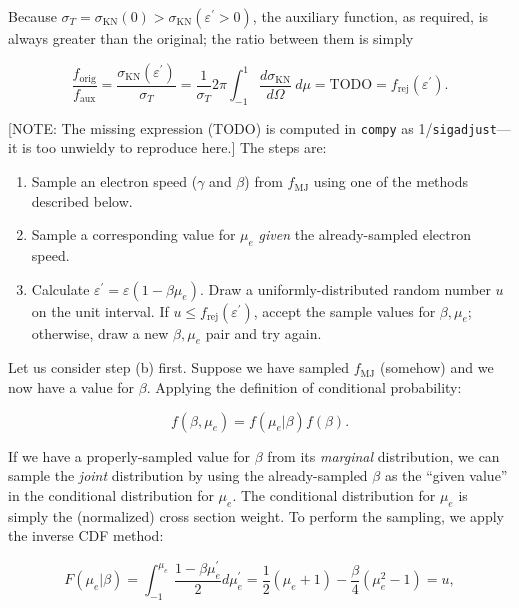 \documentclass[letterpaper]{article}
\begin{document}
\begin{enumerate}
\noindent Because $\sigma_T = \sigma_\mathrm{KN} (0) > \sigma_\mathrm{KN} (\varepsilon^\prime > 0)$, the auxiliary function, as required, is always greater than the original; the ratio between them is simply

\begin{equation}
\frac{f_\mathrm{orig}}{f_\mathrm{aux}} = \frac{\sigma_\mathrm{KN} (\varepsilon^\prime)}{\sigma_T} = \frac{1}{\sigma_T} 2\pi \int_{-1}^1 \frac{d\sigma_\mathrm{KN}}{d\Omega}\ d\mu = \mathrm{TODO} = f_\mathrm{rej}(\varepsilon^\prime).
\end{equation}

[NOTE: The missing expression (TODO) is computed in \texttt{compy} as 1/\texttt{sigadjust}---it is too unwieldy to reproduce here.] The steps are:

\begin{enumerate}
\item Sample an electron speed ($\gamma$ and $\beta$) from $f_\mathrm{MJ}$ using one of the methods described below.
\item Sample a corresponding value for $\mu_e$ \emph{given} the already-sampled electron speed.
\item Calculate $\varepsilon^\prime = \varepsilon (1 - \beta \mu_e)$. Draw a uniformly-distributed random number $u$ on the unit interval. If $u \leq f_\mathrm{rej}(\varepsilon^\prime)$, accept the sample values for $\beta, \mu_e$; otherwise, draw a new $\beta, \mu_e$ pair and try again.
\end{enumerate}

Let us consider step (b) first. Suppose we have sampled $f_\mathrm{MJ}$ (somehow) and we now have a value for $\beta$. Applying the definition of conditional probability:

\begin{equation}
f(\beta, \mu_e) = f(\mu_e | \beta) f(\beta).
\end{equation}

If we have a properly-sampled value for $\beta$ from its \emph{marginal} distribution, we can sample the \emph{joint} distribution by using the already-sampled $\beta$ as the ``given value'' in the conditional distribution for $\mu_e$. The conditional distribution for $\mu_e$ is simply the (normalized) cross section weight. To perform the sampling, we apply the inverse CDF method:

\begin{equation}
F(\mu_e | \beta) = \int_{-1}^{\mu_e} \frac{1 - \beta \mu_e^\prime}{2} d\mu_e^\prime = \frac{1}{2} (\mu_e + 1) - \frac{\beta}{4}(\mu_e^2 - 1) = u,
\end{equation}


\end{enumerate}
\end{document}

